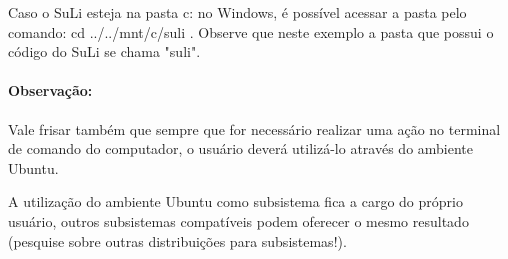 \documentclass[12pt, a4paper]{article}
\newcommand{\red}{\textcolor{red}}
\begin{document}
Caso o SuLi esteja na pasta c: no Windows, é possível acessar a pasta pelo comando: cd ../../mnt/c/suli . Observe que neste exemplo a pasta que possui o código do SuLi se chama "suli".

\paragraph{Observação:} Vale frisar também que sempre que for necessário realizar uma ação no terminal de comando do computador, o usuário deverá utilizá-lo através do ambiente Ubuntu.

A utilização do ambiente Ubuntu como subsistema fica a cargo do próprio usuário, outros subsistemas compatíveis podem oferecer o mesmo resultado (pesquise sobre outras distribuições para subsistemas!).


\newpage


\end{document}
